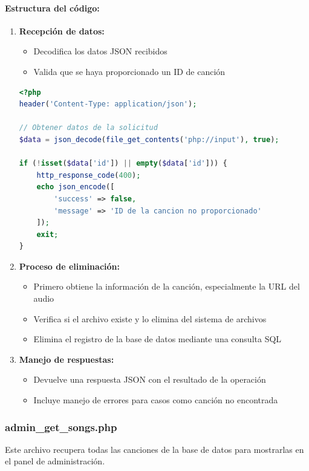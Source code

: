 \documentclass[a4paper,12pt]{article}
\begin{document}
\paragraph{Estructura del código:}
\begin{enumerate}
    \item \textbf{Recepción de datos:}
    \begin{itemize}
        \item Decodifica los datos JSON recibidos
        \item Valida que se haya proporcionado un ID de canción
    \end{itemize}
    
    \begin{lstlisting}[language=PHP]
<?php
header('Content-Type: application/json');

// Obtener datos de la solicitud
$data = json_decode(file_get_contents('php://input'), true);

if (!isset($data['id']) || empty($data['id'])) {
    http_response_code(400);
    echo json_encode([
        'success' => false,
        'message' => 'ID de la cancion no proporcionado'
    ]);
    exit;
}
    \end{lstlisting}
    
    \item \textbf{Proceso de eliminación:}
    \begin{itemize}
        \item Primero obtiene la información de la canción, especialmente la URL del audio
        \item Verifica si el archivo existe y lo elimina del sistema de archivos
        \item Elimina el registro de la base de datos mediante una consulta SQL
    \end{itemize}
    
    \item \textbf{Manejo de respuestas:}
    \begin{itemize}
        \item Devuelve una respuesta JSON con el resultado de la operación
        \item Incluye manejo de errores para casos como canción no encontrada
    \end{itemize}
\end{enumerate}

\subsubsection{admin\_get\_songs.php}
Este archivo recupera todas las canciones de la base de datos para mostrarlas en el panel de administración.
\end{document}
